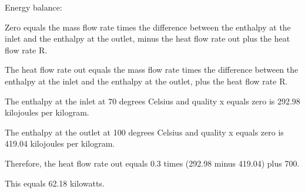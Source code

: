 Energy balance:

Zero equals the mass flow rate times the difference between the enthalpy at the inlet and the enthalpy at the outlet, minus the heat flow rate out plus the heat flow rate R.

The heat flow rate out equals the mass flow rate times the difference between the enthalpy at the inlet and the enthalpy at the outlet, plus the heat flow rate R.

The enthalpy at the inlet at 70 degrees Celsius and quality x equals zero is 292.98 kilojoules per kilogram.

The enthalpy at the outlet at 100 degrees Celsius and quality x equals zero is 419.04 kilojoules per kilogram.

Therefore, the heat flow rate out equals 0.3 times (292.98 minus 419.04) plus 700.

This equals 62.18 kilowatts.